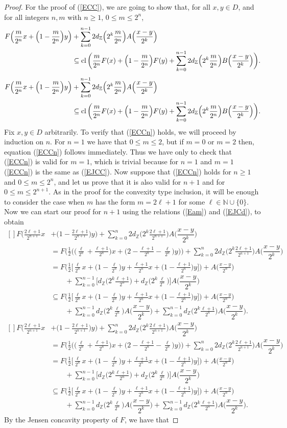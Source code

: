 \documentclass[12pt,reqno]{amsart}
\newcommand{\N}{\mathbb{N}}
\newcommand{\Z}{\mathbb{Z}}
\newcommand{\cl}{\mathop{\hbox{\rm cl}}\nolimits}
\theoremstyle{definition}
\def\eq#1{{\rm(\ref{E#1})}}
\def\Eq#1#2{\ifthenelse{\equal{#1}{*}}
  {\begin{equation*}\begin{aligned}[]#2\end{aligned}\end{equation*}}
  {\begin{equation}\begin{aligned}[]\label{E#1}#2\end{aligned}\end{equation}}}
\begin{document}
\begin{proof}
For the proof of \eq{CC}, we are going to show that, for all $x,y\in D$,
and for all integers $n,m$ with $n\geq 1$, $0\leq m\leq 2^n$,
\Eq{CCn}{
  F\Big(\frac{m}{2^n}x+\Big(1-\frac{m}{2^n}\Big)y\Big)
  &+ \sum_{k=0}^{n-1}2 d_{\Z}\Big(2^k \frac{m}{2^n}\Big)A\Big(\dfrac{x-y}{2^k}\Big) \\
 &\subseteq \cl\bigg(\frac{m}{2^n}F(x)+\Big(1-\frac{m}{2^n}\Big)F(y) 
   + \sum_{k=0}^{n-1}2d_{\Z}\Big(2^k \frac{m}{2^n}\Big)B\Big(\dfrac{x-y}{2^k}\Big)\bigg). 
}
Fix $x,y\in D$ arbitrarily. To verify that \eq{CCn} holds, we will proceed by induction on $n$. For 
$n=1$ we have that $0\leq m\leq 2$, but if $m=0$ or $m=2$ then, equation \eq{CCn} follows immediately. 
Thus we have only to check that \eq{CCn} is valid for $m=1$, which is trivial because for $n=1$ and $m=1$
\eq{CCn} is the same as \eq{JCC}. Now suppose that \eq{CCn} holds for $n\geq1$ and $0\leq m \leq 2^n$, and 
let us prove that it is also valid for $n+1$ and for $0\leq m\leq 2^{n+1}$. As in the proof for the 
convexity type inclusion, it will be enough to consider the case when $m$ has the form $m=2\ell +1$ for some 
$\ell\in\N\cup\{0\}$. Now we can start our proof for $n+1$ using the relations \eq{am} and \eq{JCd}, to obtain 
\Eq{*}{
 F\Big(\frac{2\ell +1}{2^{n+1}}x&+\Big(1-\frac{2\ell +1}{2^{n+1}}\Big)y\Big)
  + \sum_{k=0}^{n}2 d_{\Z}\Big(2^k \frac{2\ell +1}{2^{n+1}}\Big)A\Big(\dfrac{x-y}{2^k}\Big) \\ 
&=F\Bigg(\frac12\bigg(\Big(\frac{\ell}{2^{n}} + \frac{\ell +1}{2^{n}}\Big)x
	+	\Big(2-\frac{\ell +1}{2^{n}}-\frac{\ell}{2^{n}}\Big)y\bigg)\Bigg)
  + \sum_{k=0}^{n}2 d_{\Z}\Big(2^k \frac{2\ell +1}{2^{n+1}}\Big)A\Big(\dfrac{x-y}{2^k}\Big) \\
&=F\Bigg(\frac12\bigg[\frac{\ell}{2^{n}}x + \Big(1-\frac{\ell}{2^{n}}\Big)y
	+	\frac{\ell +1}{2^{n}}x+\Big(1-\frac{\ell +1}{2^{n}}\Big)y\bigg]\Bigg) + A\Big(\frac{x-y}{2^n}\Big) \\
&\qquad+ \sum_{k=0}^{n-1}\bigg[d_\Z\Big(2^k\frac{\ell+1}{2^{n}}\Big)+d_\Z\Big(2^k\frac{\ell}{2^{n}}\Big)\bigg]
	A\Big(\dfrac{x-y}{2^k}\Big) \\
&\subseteq F\Bigg(\frac12\bigg[\frac{\ell}{2^{n}}x + \Big(1-\frac{\ell}{2^{n}}\Big)y
	+	\frac{\ell +1}{2^{n}}x+\Big(1-\frac{\ell +1}{2^{n}}\Big)y\bigg]\Bigg) + A\Big(\frac{x-y}{2^n}\Big) \\
&\qquad+ \sum_{k=0}^{n-1}d_\Z\Big(2^k\frac{\ell}{2^{n}}\Big)A\Big(\dfrac{x-y}{2^k}\Big)
	+ \sum_{k=0}^{n-1}d_\Z\Big(2^k\frac{\ell+1}{2^{n}}\Big)A\Big(\dfrac{x-y}{2^k}\Big).
}
By the Jensen concavity property of $F$, we have that 

\end{proof}
\end{document}
